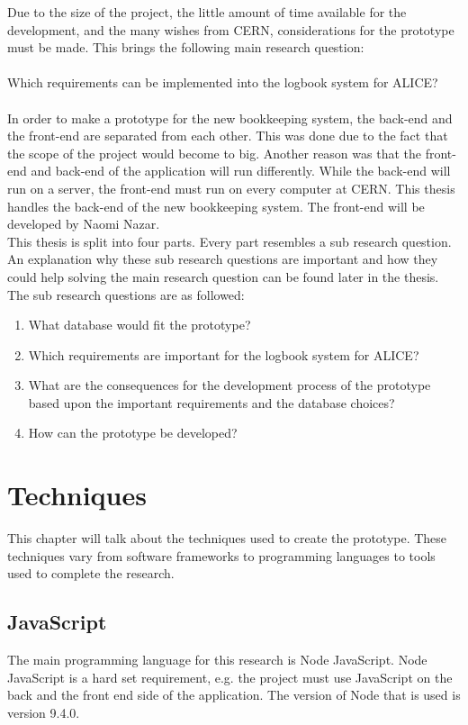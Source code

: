 \documentclass[paper=a4, fontsize=11pt,twoside]{scrartcl}	%
\begin{document}
Due to the size of the project, the little amount of time available for the development, and the many wishes from CERN, 
considerations for the prototype must be made. This brings the following main research question: \\ \\
Which requirements can be implemented into the logbook system for ALICE?
\\ \\
In order to make a prototype for the new bookkeeping system, the back-end and the front-end are separated from each other. This was done due to the fact that the scope of the project would become to big. Another reason was that the front-end and back-end of the application will run differently. While the back-end will run on a server, the front-end must run on every computer at CERN. This thesis handles the back-end of the new bookkeeping system. The front-end will be developed by Naomi Nazar. 
\\ 
This thesis is split into four parts. Every part resembles a sub research question. An explanation why these sub research questions are important and how they could help solving the main research question can be found later in the thesis. The sub research questions are as followed: \\
\begin{enumerate}
\item What database would fit the prototype?
\item Which requirements are important for the logbook system for ALICE?
\item What are the consequences for the development process of the prototype based upon the important requirements and the database choices?
\item How can the prototype be developed?
\end{enumerate}
 

 

\newpage
\section{Techniques}
This chapter will talk about the techniques used to create the prototype. These techniques vary from software frameworks to programming languages to tools used to complete the research.

\subsection{JavaScript}
The main programming language for this research is Node JavaScript. Node JavaScript is a hard set requirement, e.g. the project must use JavaScript on the back and the front end side of the application. The version of Node that is used is version 9.4.0.
\end{document}
